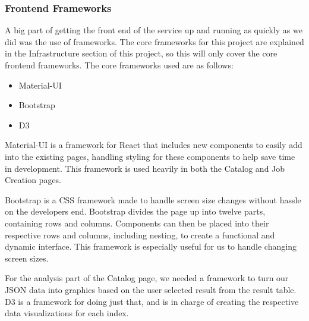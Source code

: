 \subsubsection{Frontend Frameworks}
A big part of getting the front end of the service up and running as quickly as we did was the use of frameworks. The core frameworks for this project are explained in the Infrastructure section of this project, so this will only cover the core frontend frameworks. The core frameworks used are as follows:
\begin{itemize}
  \item Material-UI
  \item Bootstrap
  \item D3
\end{itemize}
Material-UI is a framework for React that includes new components to easily add into the existing pages, handling styling for these components to help save time in development. This framework is used heavily in both the Catalog and Job Creation pages.\par
Bootstrap is a CSS framework made to handle screen size changes without hassle on the developer\textquotesingle s end. Bootstrap divides the page up into twelve parts, containing rows and columns. Components can then be placed into their respective rows and columns, including nesting, to create a functional and dynamic interface. This framework is especially useful for us to handle changing screen sizes.\par
For the analysis part of the Catalog page, we needed a framework to turn our JSON data into graphics based on the user selected result from the result table. D3 is a framework for doing just that, and is in charge of creating the respective data visualizations for each index.
